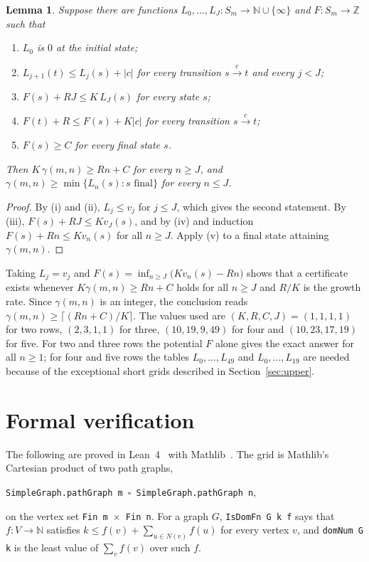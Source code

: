 \documentclass[12pt]{article}
\newcommand{\ce}[1]{\lceil #1 \rceil}
\newcommand{\N}{\mathbb{N}}
\newcommand{\Z}{\mathbb{Z}}
\theoremstyle{plain}
\newtheorem{lemma}[theorem]{Lemma}
\theoremstyle{remark}
\begin{document}
\begin{lemma}\label{lem:cert}
Suppose there are functions $L_0,\dots,L_J\colon S_m\to\N\cup\{\infty\}$ and $F\colon S_m\to\Z$
such that
\begin{enumerate}
\item[(i)] $L_0$ is $0$ at the initial state;
\item[(ii)] $L_{j+1}(t)\le L_j(s)+|c|$ for every transition $s\xrightarrow{c}t$ and every $j<J$;
\item[(iii)] $F(s)+RJ\le K\,L_J(s)$ for every state $s$;
\item[(iv)] $F(t)+R\le F(s)+K|c|$ for every transition $s\xrightarrow{c}t$;
\item[(v)] $F(s)\ge C$ for every final state $s$.
\end{enumerate}
Then $K\,\gamma(m,n)\ge Rn+C$ for every $n\ge J$, and $\gamma(m,n)\ge\min\{L_n(s):s\text{ final}\}$
for every $n\le J$.
\end{lemma}

\begin{proof}
By (i) and (ii), $L_j\le v_j$ for $j\le J$, which gives the second statement. By (iii),
$F(s)+RJ\le K v_J(s)$, and by (iv) and induction $F(s)+Rn\le K v_n(s)$ for all $n\ge J$. Apply
(v) to a final state attaining $\gamma(m,n)$.
\end{proof}

Taking $L_j=v_j$ and $F(s)=\inf_{n\ge J}\bigl(Kv_n(s)-Rn\bigr)$ shows that a certificate exists
whenever $K\gamma(m,n)\ge Rn+C$ holds for all $n\ge J$ and $R/K$ is the growth rate. Since
$\gamma(m,n)$ is an integer, the conclusion reads $\gamma(m,n)\ge\ce{(Rn+C)/K}$. The values used
are $(K,R,C,J)=(1,1,1,1)$ for two rows, $(2,3,1,1)$ for three, $(10,19,9,49)$ for four and
$(10,23,17,19)$ for five. For two and three rows the potential $F$ alone gives the exact answer
for all $n\ge1$; for four and five rows the tables $L_0,\dots,L_{49}$ and $L_0,\dots,L_{19}$
are needed because of the exceptional short grids described in Section~\ref{sec:upper}.

\section{Formal verification}\label{sec:lean}

The following are proved in Lean~4~\cite{lean4} with Mathlib~\cite{mathlib}. The grid is
Mathlib's Cartesian product of two path graphs,
\begin{center}
\texttt{SimpleGraph.pathGraph m $\square$ SimpleGraph.pathGraph n},
\end{center}
on the vertex set \texttt{Fin m $\times$ Fin n}. For a graph $G$, \texttt{IsDomFn G k f} says that
$f\colon V\to\N$ satisfies $k\le f(v)+\sum_{u\in N(v)}f(u)$ for every vertex $v$, and
\texttt{domNum G k} is the least value of $\sum_v f(v)$ over such $f$.
\end{document}
